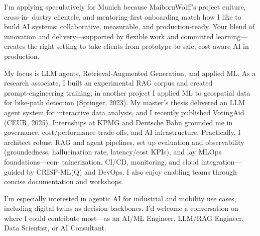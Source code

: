 I’m applying speculatively for Munich because MaibornWolff’s project culture, cross‑in- dustry clientele, and mentoring-first onboarding match how I like to build AI systems: collaborative, measurable, and production‑ready. Your blend of innovation and delivery—supported by flexible work and committed learning—creates the right setting to take clients from prototype to safe, cost‑aware AI in production.

My focus is LLM agents, Retrieval‑Augmented Generation, and applied ML. As a research associate, I built an experimental RAG corpus and created prompt‑engineering training; in another project I applied ML to geospatial data for bike‑path detection (Springer, 2023). My master’s thesis delivered an LLM agent system for interactive data analysis, and I recently published VotingAid (CEUR, 2025). Internships at KPMG and Deutsche Bahn grounded me in governance, cost/performance trade‑offs, and AI infrastructure. Practically, I architect robust RAG and agent pipelines, set up evaluation and observability (groundedness, hallucination rate, latency/cost KPIs), and lay MLOps foundations—con- tainerization, CI/CD, monitoring, and cloud integration—guided by CRISP‑ML(Q) and DevOps. I also enjoy enabling teams through concise documentation and workshops.

I’m especially interested in agentic AI for industrial and mobility use cases, including digital twins as decision backbones. I’d welcome a conversation on where I could contribute most—as an AI/ML Engineer, LLM/RAG Engineer, Data Scientist, or AI Consultant.